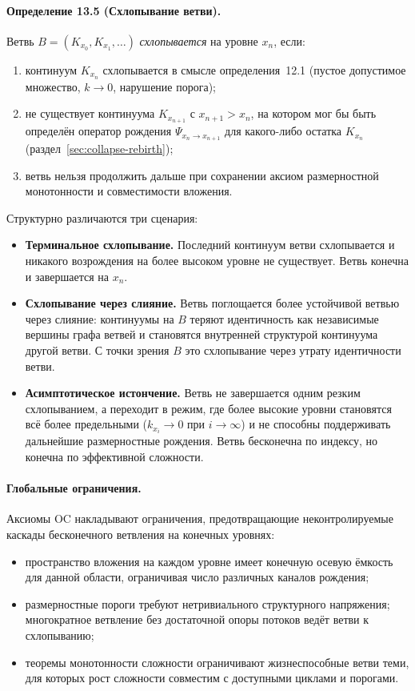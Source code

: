 \paragraph{Определение 13.5 (Схлопывание ветви).}
Ветвь \(B = (K_{x_0}, K_{x_1}, \dots)\) \emph{схлопывается} на уровне
\(x_n\), если:
\begin{enumerate}
  \item континуум \(K_{x_n}\) схлопывается в смысле
        определения~12.1 (пустое допустимое множество, \(k\to 0\),
        нарушение порога);
  \item не существует континуума \(K_{x_{n+1}}\) с \(x_{n+1}>x_n\), на
        котором мог бы быть определён оператор рождения
        \(\Psi_{x_n\to x_{n+1}}\) для какого-либо остатка \(K_{x_n}\)
        (раздел~\ref{sec:collapse-rebirth});
  \item ветвь нельзя продолжить дальше при сохранении аксиом размерностной
        монотонности и совместимости вложения.
\end{enumerate}

Структурно различаются три сценария:
\begin{itemize}
  \item \textbf{Терминальное схлопывание.}\quad
        Последний континуум ветви схлопывается и никакого возрождения на более
        высоком уровне не существует. Ветвь конечна и завершается на \(x_n\).
  \item \textbf{Схлопывание через слияние.}\quad
        Ветвь поглощается более устойчивой ветвью через слияние:
        континуумы на \(B\) теряют идентичность как независимые вершины
        графа ветвей и становятся внутренней структурой континуума другой
        ветви. С точки зрения \(B\) это схлопывание через утрату
        идентичности ветви.
  \item \textbf{Асимптотическое истончение.}\quad
        Ветвь не завершается одним резким схлопыванием, а переходит в режим,
        где более высокие уровни становятся всё более предельными
        (\(k_{x_i}\to 0\) при \(i\to\infty\)) и не способны поддерживать
        дальнейшие размерностные рождения. Ветвь бесконечна по индексу,
        но конечна по эффективной сложности.
\end{itemize}

\paragraph{Глобальные ограничения.}
Аксиомы OC накладывают ограничения, предотвращающие неконтролируемые
каскады бесконечного ветвления на конечных уровнях:
\begin{itemize}
  \item пространство вложения на каждом уровне имеет конечную осевую ёмкость для
        данной области, ограничивая число различных каналов рождения;
  \item размерностные пороги требуют нетривиального структурного
        напряжения; многократное ветвление без достаточной опоры потоков
        ведёт ветви к схлопыванию;
  \item теоремы монотонности сложности ограничивают жизнеспособные ветви теми,
        для которых рост сложности совместим с доступными циклами и порогами.
\end{itemize}

